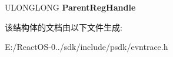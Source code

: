 \begin{DoxyCompactItemize}
\begin{tabbing}
\end{tabbing}\item 
\mbox{\label{struct___e_v_e_n_t___i_n_s_t_a_n_c_e___h_e_a_d_e_r_aa64884bd7f546ffbdbcaab9bd6291b40}} 
U\+L\+O\+N\+G\+L\+O\+NG {\bfseries Parent\+Reg\+Handle}
\end{DoxyCompactItemize}


该结构体的文档由以下文件生成\+:\begin{DoxyCompactItemize}
\item 
E\+:/\+React\+O\+S-\/0../sdk/include/psdk/evntrace.\+h\end{DoxyCompactItemize}
